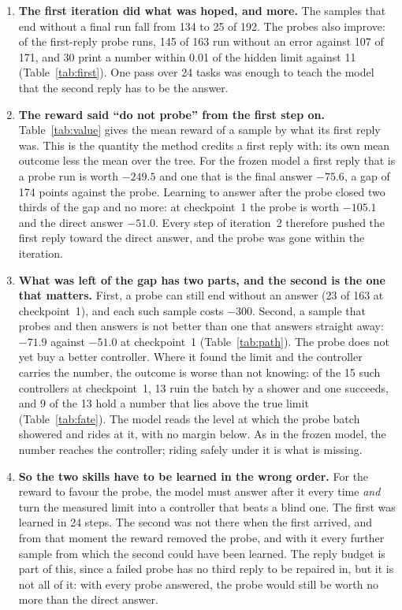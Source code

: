 \documentclass[11pt,a4paper]{article}
\begin{document}
\begin{enumerate}[leftmargin=*, itemsep=0.5em]
\item \textbf{The first iteration did what was hoped, and more.} The samples
  that end without a final run fall from 134 to 25 of 192. The probes also
  improve: of the first-reply probe runs, 145 of 163 run without an error
  against 107 of 171, and 30 print a number within 0.01 of the hidden limit
  against 11 (Table~\ref{tab:first}). One pass over 24 tasks was enough to
  teach the model that the second reply has to be the answer.

\item \textbf{The reward said ``do not probe'' from the first step on.}
  Table~\ref{tab:value} gives the mean reward of a sample by what its first
  reply was. This is the quantity the method credits a first reply with: its
  own mean outcome less the mean over the tree. For the frozen model a first
  reply that is a probe run is worth $-249.5$ and one that is the final
  answer $-75.6$, a gap of 174 points against the probe. Learning to answer
  after the probe closed two thirds of the gap and no more: at checkpoint~1
  the probe is worth $-105.1$ and the direct answer $-51.0$. Every step of
  iteration~2 therefore pushed the first reply toward the direct answer, and
  the probe was gone within the iteration.

\item \textbf{What was left of the gap has two parts, and the second is the
  one that matters.} First, a probe can still end without an answer (23 of
  163 at checkpoint~1), and each such sample costs $-300$. Second, a sample
  that probes and then answers is not better than one that answers straight
  away: $-71.9$ against $-51.0$ at checkpoint~1 (Table~\ref{tab:path}). The
  probe does not yet buy a better controller. Where it found the limit and
  the controller carries the number, the outcome is worse than not knowing:
  of the 15 such controllers at checkpoint~1, 13 ruin the batch by a shower
  and one succeeds, and 9 of the 13 hold a number that lies above the true
  limit (Table~\ref{tab:fate}). The model reads the level at which the probe
  batch showered and rides at it, with no margin below. As in the frozen
  model, the number reaches the controller; riding safely under it is what
  is missing.

\item \textbf{So the two skills have to be learned in the wrong order.}
  For the reward to favour the probe, the model must answer after it every
  time \emph{and} turn the measured limit into a controller that beats a
  blind one. The first was learned in 24 steps. The second was not there
  when the first arrived, and from that moment the reward removed the probe,
  and with it every further sample from which the second could have been
  learned. The reply budget is part of this, since a failed probe has no
  third reply to be repaired in, but it is not all of it: with every probe
  answered, the probe would still be worth no more than the direct answer.


\end{enumerate}
\end{document}
